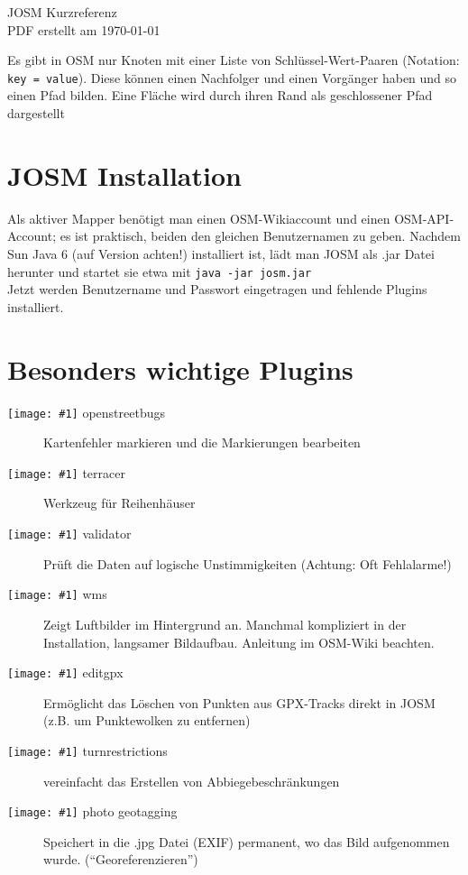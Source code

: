 \documentclass[a4paper,11pt,notumble]{leaflet}
\newcommand{\Icon}[1]{\texttt{[image: \#1]}}
\begin{document}
 

{\Huge JOSM Kurzreferenz}\\
{\small PDF erstellt am \today}

Es gibt in OSM nur Knoten mit einer Liste von Schlüssel-Wert-Paaren (Notation: \texttt{key\,=\,value}).
Diese können einen Nachfolger und einen Vorgänger haben und so einen Pfad bilden.
Eine Fläche wird durch ihren Rand als geschlossener Pfad dargestellt

\section*{JOSM Installation} 
Als aktiver Mapper benötigt man einen OSM-Wikiaccount 
und einen OSM-API-Account; es ist praktisch, beiden den gleichen Benutzernamen zu geben.
Nachdem Sun Java 6 (auf Version achten!) installiert ist, lädt man JOSM als .jar Datei herunter und startet sie
etwa mit \texttt{java -jar josm.jar}\\
Jetzt werden Benutzername und Passwort eingetragen und fehlende Plugins installiert.

\section*{Besonders wichtige Plugins}
\begin{description}
\item[\Icon{openstreetbugs.png} openstreetbugs] Kartenfehler markieren und die Markierungen bearbeiten
\item[\Icon{terrace.png} terracer] Werkzeug für Reihenhäuser
\item[\Icon{validator.png} validator] Prüft die Daten auf logische Unstimmigkeiten (Achtung: Oft  Fehlalarme!)
\item[\Icon{wms.png} wms] Zeigt Luftbilder im Hintergrund an. Manchmal kompliziert in der Installation, langsamer Bildaufbau. Anleitung im OSM-Wiki beachten.
\item[\Icon{editgpxmode.png} editgpx] Ermöglicht das Löschen von Punkten aus GPX-Tracks direkt in JOSM (z.B. um Punktewolken zu entfernen)
\item[\Icon{turnrestrictions.png} turnrestrictions] vereinfacht das Erstellen von Abbiegebeschränkungen
\item[\Icon{geotagging.png} photo geotagging] Speichert in die .jpg Datei (EXIF) permanent, wo das Bild aufgenommen wurde. ("`Georeferenzieren"')
\end{description}
\end{document}
